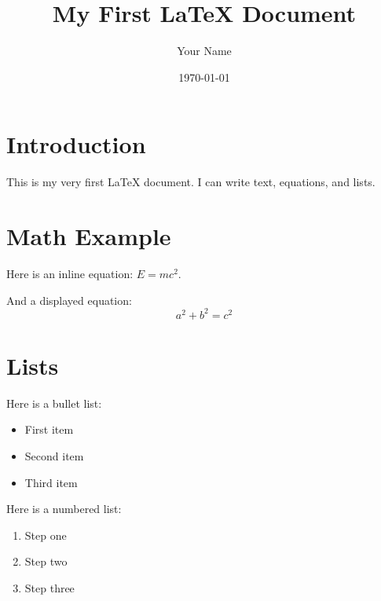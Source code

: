 \documentclass{article}
\title{My First LaTeX Document}
\author{Your Name}
\date{\today}
\begin{document}
\maketitle

\section{Introduction}
This is my very first LaTeX document.  
I can write text, equations, and lists.

\section{Math Example}
Here is an inline equation: $E = mc^2$.  

And a displayed equation:
\[
a^2 + b^2 = c^2
\]

\section{Lists}
Here is a bullet list:
\begin{itemize}
    \item First item
    \item Second item
    \item Third item
\end{itemize}

Here is a numbered list:
\begin{enumerate}
    \item Step one
    \item Step two
    \item Step three
\end{enumerate}
\end{document}
